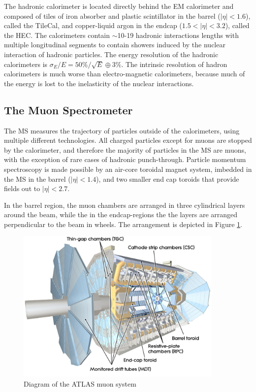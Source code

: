 The hadronic calorimeter is located directly behind the EM calorimeter and composed of tiles of iron absorber and plastic scintillator  in the barrel ($|\eta| < 1.6$), called the TileCal,  and copper-liquid argon in the endcap ($1.5<|\eta| <3.2$), called the HEC. The calorimeters contain $\sim$10-19 hadronic interactions lengths with multiple longitudinal segments to contain showers induced by the nuclear interaction of hadronic particles. The energy resolution of the hadronic calorimeters is $\sigma_E/E = 50\%/\sqrt{E}\oplus3\%$. The intrinsic resolution of hadron calorimeters is much worse than electro-magnetic calorimeters, because much of the energy is lost to the inelasticity of the nuclear interactions. 

\subsection{The Muon Spectrometer} 

The MS measures the trajectory of particles outside of the calorimeters, using multiple different technologies. All charged particles except for muons are stopped by the calorimeter, and therefore the majority of particles in the MS are muons, with the exception of rare cases of hadronic punch-through. Particle momentum spectroscopy is made possible by an air-core toroidal magnet system, imbedded in the MS in the barrel ($|\eta| < 1.4$), and two smaller end cap toroids that provide fields out to $|\eta| < 2.7$. 

In the barrel region, the muon chambers are arranged in three cylindrical layers around the beam, while the in the endcap-regions the the layers are arranged perpendicular to the beam in wheels. The arrangement is depicted in Figure \ref{figure:lhc_muon}.

\begin{figure}
\centering 
\includegraphics[width=0.9\textwidth]{figs/lhc/MuonSystem-eps-converted-to}
\caption{Diagram of the ATLAS muon system}
\label{figure:lhc_muon}
\end{figure}

